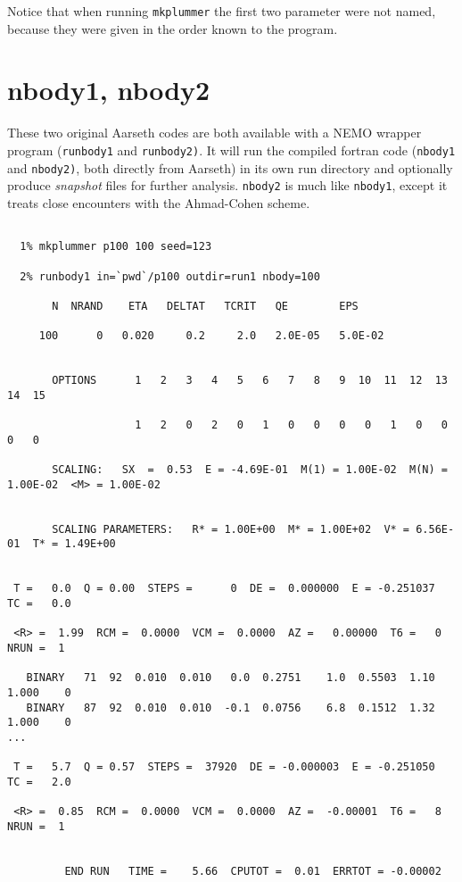 Notice that when running {\tt mkplummer} the first two parameter
were not named, because they were given in the order known to the program.


\section{nbody1, nbody2}

These two original Aarseth codes are both available with a NEMO wrapper program
({\tt runbody1} and {\tt runbody2)}. It will run the compiled fortran 
code ({\tt nbody1} and {\tt nbody2)}, both directly from Aarseth)
in its own run directory and 
optionally produce {\it snapshot} files for further
analysis. {\tt nbody2}  is much like {\tt nbody1}, except it
treats close encounters with the Ahmad-Cohen scheme.

\footnotesize\begin{verbatim}

  1% mkplummer p100 100 seed=123

  2% runbody1 in=`pwd`/p100 outdir=run1 nbody=100

       N  NRAND    ETA   DELTAT   TCRIT   QE        EPS

     100      0   0.020     0.2     2.0   2.0E-05   5.0E-02
 
 
       OPTIONS      1   2   3   4   5   6   7   8   9  10  11  12  13  14  15

                    1   2   0   2   0   1   0   0   0   0   1   0   0   0   0
 
       SCALING:   SX  =  0.53  E = -4.69E-01  M(1) = 1.00E-02  M(N) = 1.00E-02  <M> = 1.00E-02
 

       SCALING PARAMETERS:   R* = 1.00E+00  M* = 1.00E+02  V* = 6.56E-01  T* = 1.49E+00
 
 
 T =   0.0  Q = 0.00  STEPS =      0  DE =  0.000000  E = -0.251037  TC =   0.0
 
 <R> =  1.99  RCM =  0.0000  VCM =  0.0000  AZ =   0.00000  T6 =   0  NRUN =  1
 
   BINARY   71  92  0.010  0.010   0.0  0.2751    1.0  0.5503  1.10  1.000    0
   BINARY   87  92  0.010  0.010  -0.1  0.0756    6.8  0.1512  1.32  1.000    0
...
 
 T =   5.7  Q = 0.57  STEPS =  37920  DE = -0.000003  E = -0.251050  TC =   2.0
 
 <R> =  0.85  RCM =  0.0000  VCM =  0.0000  AZ =  -0.00001  T6 =   8  NRUN =  1
 
 
         END RUN   TIME =    5.66  CPUTOT =  0.01  ERRTOT = -0.00002

\end{verbatim}\normalsize

